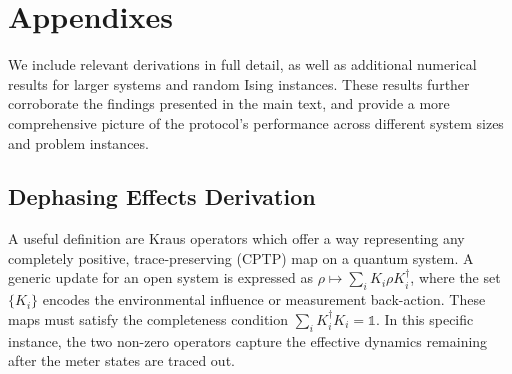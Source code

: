 \appendix

\chapter{Appendixes}\label{appendix:appendices}

\qquad We include relevant derivations in full detail, as well as additional numerical results for larger systems and random Ising instances. These results further corroborate the findings presented in the main text, and provide a more comprehensive picture of the protocol's performance across different system sizes and problem instances.


\section{Dephasing Effects Derivation} \label{DephasingEffectsDerivation}

\qquad A useful definition are Kraus operators which offer a way representing any completely positive, trace-preserving (CPTP) map on a quantum system. A generic update for an open system is expressed as $\rho\mapsto\sum_i K_i\rho K_i^{\dagger}$, where the set $\{K_i\}$ encodes the environmental influence or measurement back-action. These maps must satisfy the completeness condition $\sum_i K_i^{\dagger}K_i=\mathds{1}$. In this specific instance, the two non-zero operators capture the effective dynamics remaining after the meter states are traced out.

